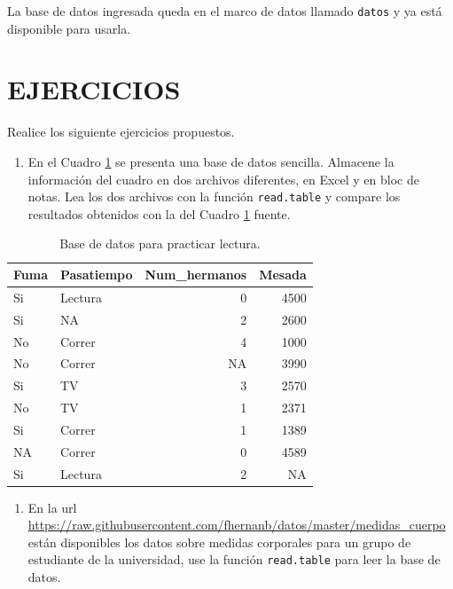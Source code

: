 \documentclass[10pt,]{krantz}
\providecommand{\tightlist}{%
  \setlength{\itemsep}{0pt}\setlength{\parskip}{0pt}}
\begin{document}
La base de datos ingresada queda en el marco de datos llamado
\texttt{datos} y ya está disponible para usarla.

\section*{EJERCICIOS}\label{ejercicios-3}


Realice los siguiente ejercicios propuestos.

\begin{enumerate}
\def\labelenumi{\arabic{enumi}.}
\tightlist
\item
  En el Cuadro \ref{tab:toy} se presenta una base de datos sencilla.
  Almacene la información del cuadro en dos archivos diferentes, en
  Excel y en bloc de notas. Lea los dos archivos con la función
  \texttt{read.table} y compare los resultados obtenidos con la del
  Cuadro \ref{tab:toy} fuente.
\end{enumerate}

\begin{table}

\caption{\label{tab:toy}Base de datos para practicar lectura.}
\centering
\begin{tabular}[t]{llrr}
\toprule
Fuma & Pasatiempo & Num\_hermanos & Mesada\\
\midrule
Si & Lectura & 0 & 4500\\
Si & NA & 2 & 2600\\
No & Correr & 4 & 1000\\
No & Correr & NA & 3990\\
Si & TV & 3 & 2570\\
\addlinespace
No & TV & 1 & 2371\\
Si & Correr & 1 & 1389\\
NA & Correr & 0 & 4589\\
Si & Lectura & 2 & NA\\
\bottomrule
\end{tabular}
\end{table}

\begin{enumerate}
\def\labelenumi{\arabic{enumi}.}
\setcounter{enumi}{1}
\tightlist
\item
  En la url
  \url{https://raw.githubusercontent.com/fhernanb/datos/master/medidas_cuerpo}
  están disponibles los datos sobre medidas corporales para un grupo de
  estudiante de la universidad, use la función \texttt{read.table} para
  leer la base de datos.
\end{enumerate}
\end{document}
